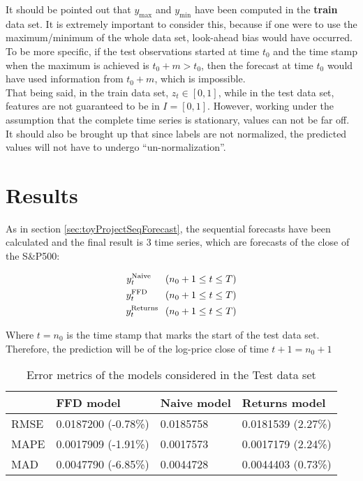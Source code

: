 \documentclass[a4paper]{report}
\begin{document}
It should be pointed out that $y_{\text{max}}$ and $y_{\text{min}}$ have 
been computed in the \textbf{train} data set. It is extremely important to 
consider this, because if one were to use the maximum/minimum of the whole 
data set, look-ahead bias would have occurred. To be more specific, if the 
test observations started at time $t_0$ and the time stamp when the maximum 
is achieved is $t_0 + m > t_0$, then the forecast at time $t_0$ would have 
used information from $t_0 + m$, which is impossible.\\

That being said, in the train data set, $z_t \in [0, 1]$, while in the test 
data set, features are not guaranteed to be in $I = [0, 1]$. However, 
working under the assumption that the complete time series is stationary, 
values can not be far off.\\

It should also be brought up that since labels are not normalized, the 
predicted values will not have to undergo ``un-normalization''.

\section{Results}
\label{sec:resultsFFD}
As in section \ref{sec:toyProjectSeqForecast}, the sequential forecasts have 
been calculated and the final result is 3 time series, which are forecasts 
of the close of the S\&P500:

\begin{align*}
	y_t^{\text{Naive}} \hspace{.51cm} (n_0 + 1 \leq t \leq T)\\
	y_t^{\text{FFD}} \hspace{.64cm} (n_0 + 1 \leq t \leq T)\\
	y_t^{\text{Returns}} \hspace{.25cm} \hfill (n_0 + 1 \leq t \leq T)\\
\end{align*}

Where $t = n_0$ is the time stamp that marks the start of the test data set. 
Therefore, the prediction will be of the log-price close of time $t + 1 = 
n_0 + 1$

\begin{table}[htbp]
\centering
	\caption{Error metrics of the models considered in the Test data set}
	\label{tab:MetricsFFD}
	\begin{tabular}{ |C{2.5cm}|C{3.5cm}|C{2.5cm}|C{3.5cm}| }
		\hline
			 & FFD model 	& Naive model 	& Returns model\\
		\hline
		RMSE & 0.0187200 (-0.78\%) & 0.0185758 & 0.0181539 (2.27\%)\\
		MAPE & 0.0017909 (-1.91\%) & 0.0017573 & 0.0017179 (2.24\%)\\
		MAD  & 0.0047790 (-6.85\%) & 0.0044728 & 0.0044403 (0.73\%)\\
		\hline
	\end{tabular}
\end{table}
\end{document}

